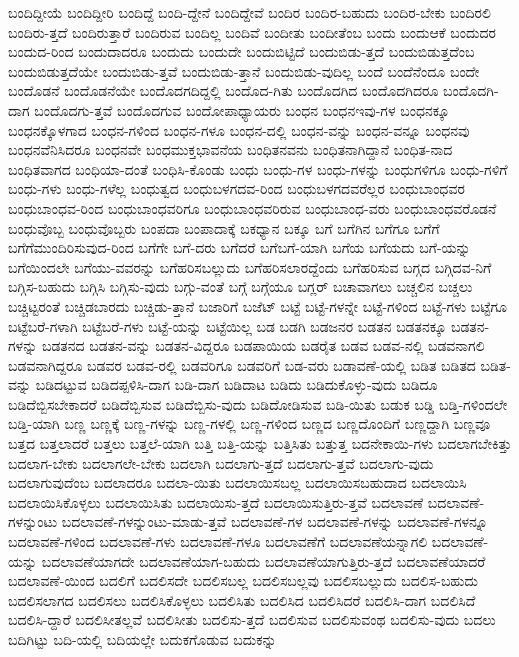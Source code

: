 {ಬಂದಿದ್ದೀಯೆ
ಬಂದಿದ್ದೀರಿ
ಬಂದಿದ್ದೆ
ಬಂದಿ-ದ್ದೇನೆ
ಬಂದಿದ್ದೇವೆ
ಬಂದಿರ
ಬಂದಿರ-ಬಹುದು
ಬಂದಿರ-ಬೇಕು
ಬಂದಿರಲಿ
ಬಂದಿರು-ತ್ತದೆ
ಬಂದಿರುತ್ತಾರೆ
ಬಂದಿರುವ
ಬಂದಿಲ್ಲ
ಬಂದಿವೆ
ಬಂದೀತು
ಬಂದೀತೆಂಬ
ಬಂದು
ಬಂದುಆಕೆ
ಬಂದುದರ
ಬಂದುದ-ರಿಂದ
ಬಂದುದಾದರೂ
ಬಂದುದು
ಬಂದುದೇ
ಬಂದುಬಿಟ್ಟಿದೆ
ಬಂದುಬಿಡು-ತ್ತದೆ
ಬಂದುಬಿಡುತ್ತದೆಂಬ
ಬಂದುಬಿಡುತ್ತದೆಯೇ
ಬಂದುಬಿಡು-ತ್ತವೆ
ಬಂದುಬಿಡು-ತ್ತಾನೆ
ಬಂದುಬಿಡು-ವುದಿಲ್ಲ
ಬಂದೆ
ಬಂದೆನೆಂದೂ
ಬಂದೇ
ಬಂದೊಡನೆ
ಬಂದೊಡನೆಯೇ
ಬಂದೊದಗದಿದ್ದಲ್ಲಿ
ಬಂದೊದ-ಗಿತು
ಬಂದೊದಗಿದ
ಬಂದೊದಗಿದರೂ
ಬಂದೊದಗಿ-ದಾಗ
ಬಂದೊದಗು-ತ್ತವೆ
ಬಂದೊದಗುವ
ಬಂದೋಪಾಧ್ಯಾಯರು
ಬಂಧನ
ಬಂಧನಇವು-ಗಳ
ಬಂಧನಕ್ಕೂ
ಬಂಧನಕ್ಕೊಳಗಾದ
ಬಂಧನ-ಗಳಿಂದ
ಬಂಧನ-ಗಳೂ
ಬಂಧನ-ದಲ್ಲಿ
ಬಂಧನ-ವನ್ನು
ಬಂಧನ-ವನ್ನೂ
ಬಂಧನವು
ಬಂಧನವೆನಿಸಿದರೂ
ಬಂಧನವೇ
ಬಂಧಮುಕ್ತಭಾವನೆಯ
ಬಂಧಿತನವನು
ಬಂಧಿತನಾಗಿದ್ದಾನೆ
ಬಂಧಿತ-ನಾದ
ಬಂಧಿತವಾಗದ
ಬಂಧಿಯಾ-ದಂತೆ
ಬಂಧಿಸಿ-ಕೊಂಡು
ಬಂಧು
ಬಂಧು-ಗಳ
ಬಂಧು-ಗಳನ್ನು
ಬಂಧುಗಳಿಗೂ
ಬಂಧು-ಗಳಿಗೆ
ಬಂಧು-ಗಳು
ಬಂಧು-ಗಳೆಲ್ಲ
ಬಂಧುತ್ವದ
ಬಂಧುಬಳಗದವ-ರಿಂದ
ಬಂಧುಬಳಗದವರೆಲ್ಲರ
ಬಂಧುಬಾಂಧವರ
ಬಂಧುಬಾಂಧವ-ರಿಂದ
ಬಂಧುಬಾಂಧವರಿಗೂ
ಬಂಧುಬಾಂಧವರಿರುವ
ಬಂಧುಬಾಂಧ-ವರು
ಬಂಧುಬಾಂಧವರೊಡನೆ
ಬಂಧುವೊಬ್ಬ
ಬಂಧುವೊಬ್ಬರು
ಬಂಪದಾ
ಬಂಪಾದಾಕ್ಕೆ
ಬಕಧ್ಯಾನ
ಬಕ್ಕೂ
ಬಗೆ
ಬಗೆಗಿನ
ಬಗೆಗೂ
ಬಗೆಗೆ
ಬಗೆಗೆಮುಂದಿರಿಸುವುದ-ರಿಂದ
ಬಗೆಗೇ
ಬಗೆ-ದರು
ಬಗೆದರೆ
ಬಗೆಬಗೆ-ಯಾಗಿ
ಬಗೆಯ
ಬಗೆಯದು
ಬಗೆ-ಯನ್ನು
ಬಗೆಯಿಂದಲೇ
ಬಗೆಯು-ವವರನ್ನು
ಬಗೆಹರಿಸಬಲ್ಲುದು
ಬಗೆಹರಿಸಲಾರದ್ದೆಂದು
ಬಗೆಹರಿಸುವ
ಬಗ್ಗದ
ಬಗ್ಗಿದವ-ನಿಗೆ
ಬಗ್ಗಿಸ-ಬಹುದು
ಬಗ್ಗಿಸಿ
ಬಗ್ಗಿಸು-ವುದು
ಬಗ್ಗು-ವಂತೆ
ಬಗ್ಗೆ
ಬಗ್ಗೆಯೂ
ಬಗ್ಲರ್
ಬಚಾವಾಗಲು
ಬಚ್ಚಲಿನ
ಬಚ್ಚಲು
ಬಚ್ಚಿಟ್ಟರಂತೆ
ಬಚ್ಚಿಡಬಾರದು
ಬಚ್ಚಿಡು-ತ್ತಾನೆ
ಬಜಾರಿಗೆ
ಬಜೆಟ್
ಬಟ್ಟೆ
ಬಟ್ಟೆ-ಗಳನ್ನೇ
ಬಟ್ಟೆ-ಗಳಿಂದ
ಬಟ್ಟೆ-ಗಳು
ಬಟ್ಟೆಗೂ
ಬಟ್ಟೆಬರೆ-ಗಳಾಗಿ
ಬಟ್ಟೆಬರೆ-ಗಳು
ಬಟ್ಟೆ-ಯನ್ನು
ಬಟ್ಟೆಯಿಲ್ಲ
ಬಡ
ಬಡಗಿ
ಬಡಜನರ
ಬಡತನ
ಬಡತನಕ್ಕೂ
ಬಡತನ-ಗಳನ್ನು
ಬಡತನದ
ಬಡತನ-ವನ್ನು
ಬಡತನ-ವಿದ್ದರೂ
ಬಡಪಾಯಿಯ
ಬಡರೈತ
ಬಡವ
ಬಡವ-ನಲ್ಲಿ
ಬಡವನಾಗಲಿ
ಬಡವನಾಗಿದ್ದರೂ
ಬಡವರ
ಬಡವ-ರಲ್ಲಿ
ಬಡವರಿಗೂ
ಬಡವರಿಗೆ
ಬಡ-ವರು
ಬಡಾವಣೆ-ಯಲ್ಲಿ
ಬಡಿತ
ಬಡಿತದ
ಬಡಿತ-ವನ್ನು
ಬಡಿದಟ್ಟುವ
ಬಡಿದಪ್ಪಳಿಸಿ-ದಾಗ
ಬಡಿ-ದಾಗ
ಬಡಿದಾಟ
ಬಡಿದು
ಬಡಿದುಕೊಳ್ಳು-ವುದು
ಬಡಿದೂ
ಬಡಿದೆಬ್ಬಿಸಬೇಕಾದರೆ
ಬಡಿದೆಬ್ಬಿಸುವ
ಬಡಿದೆಬ್ಬಿಸು-ವುದು
ಬಡಿದೋಡಿಸುವ
ಬಡಿ-ಯಿತು
ಬಡುಕ
ಬಡ್ಡಿ
ಬಡ್ತಿ-ಗಳಿಂದಲೇ
ಬಡ್ತಿ-ಯಾಗಿ
ಬಣ್ಣ
ಬಣ್ಣಕ್ಕೆ
ಬಣ್ಣ-ಗಳನ್ನು
ಬಣ್ಣ-ಗಳಲ್ಲಿ
ಬಣ್ಣ-ಗಳಿಂದ
ಬಣ್ಣದ
ಬಣ್ಣದೊಂದಿಗೆ
ಬಣ್ಣದ್ದಾಗಿ
ಬಣ್ಣವೂ
ಬತ್ತದ
ಬತ್ತಲಾದರೆ
ಬತ್ತಲು
ಬತ್ತಲೆ-ಯಾಗಿ
ಬತ್ತಿ
ಬತ್ತಿ-ಯನ್ನು
ಬತ್ತಿಸಿತು
ಬತ್ತುತ್ತ
ಬದನೇಕಾಯಿ-ಗಳು
ಬದಲಾಗಬೇಕಿತ್ತು
ಬದಲಾಗ-ಬೇಕು
ಬದಲಾಗಲೇ-ಬೇಕು
ಬದಲಾಗಿ
ಬದಲಾಗು-ತ್ತದೆ
ಬದಲಾಗು-ತ್ತವೆ
ಬದಲಾಗು-ವುದು
ಬದಲಾಗುವುದೆಂಬ
ಬದಲಾದರೂ
ಬದಲಾ-ಯಿತು
ಬದಲಾಯಿಸಬಲ್ಲ
ಬದಲಾಯಿಸಬಹುದಾದ
ಬದಲಾಯಿಸಿ
ಬದಲಾಯಿಸಿಕೊಳ್ಳಲು
ಬದಲಾಯಿಸಿತು
ಬದಲಾಯಿಸು-ತ್ತದೆ
ಬದಲಾಯಿಸುತ್ತಿರು-ತ್ತವೆ
ಬದಲಾವಣೆ
ಬದಲಾವಣೆ-ಗಳನ್ನುಂಟು
ಬದಲಾವಣೆ-ಗಳನ್ನುಂಟು-ಮಾಡು-ತ್ತವೆ
ಬದಲಾವಣೆ-ಗಳ
ಬದಲಾವಣೆ-ಗಳನ್ನು
ಬದಲಾವಣೆ-ಗಳನ್ನೂ
ಬದಲಾವಣೆ-ಗಳಿಂದ
ಬದಲಾವಣೆ-ಗಳು
ಬದಲಾವಣೆ-ಗಳೂ
ಬದಲಾವಣೆಗೆ
ಬದಲಾವಣೆಯನ್ನಾಗಲಿ
ಬದಲಾವಣೆ-ಯನ್ನು
ಬದಲಾವಣೆಯಾಗದೇ
ಬದಲಾವಣೆಯಾಗ-ಬಹುದು
ಬದಲಾವಣೆಯಾಗುತ್ತಿರು-ತ್ತದೆ
ಬದಲಾವಣೆಯಾದರೆ
ಬದಲಾವಣೆ-ಯಿಂದ
ಬದಲಿಗೆ
ಬದಲಿಸದೇ
ಬದಲಿಸಬಲ್ಲ
ಬದಲಿಸಬಲ್ಲವು
ಬದಲಿಸಬಲ್ಲುದು
ಬದಲಿಸ-ಬಹುದು
ಬದಲಿಸಲಾಗದ
ಬದಲಿಸಲು
ಬದಲಿಸಿಕೊಳ್ಳಲು
ಬದಲಿಸಿತು
ಬದಲಿಸಿದ
ಬದಲಿಸಿದರೆ
ಬದಲಿಸಿ-ದಾಗ
ಬದಲಿಸಿದೆ
ಬದಲಿಸಿ-ದ್ದಾರೆ
ಬದಲಿಸೀತಲ್ಲವೆ
ಬದಲಿಸೀತು
ಬದಲಿಸು-ತ್ತದೆ
ಬದಲಿಸುವ
ಬದಲಿಸುವಂಥ
ಬದಲಿಸು-ವುದು
ಬದಲು
ಬದಿಗಿಟ್ಟು
ಬದಿ-ಯಲ್ಲಿ
ಬದಿಯಲ್ಲೇ
ಬದುಕಗೊಡುವ
ಬದುಕನ್ನು
}

